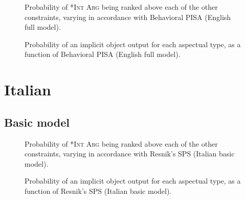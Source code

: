 \begin{figure}[H]
\caption{Probability of \textsc{*Int Arg} being ranked above each of the other constraints, varying in accordance with Behavioral PISA (English full model).}
    
\end{figure}

\begin{figure}[H]
\caption{Probability of an implicit object output for each aspectual type, as a function of Behavioral PISA (English full model).}
    
\end{figure}


\clearpage %

\section{Italian} 

\subsection{Basic model} 


\begin{figure}[H]
\caption{Probability of \textsc{*Int Arg} being ranked above each of the other constraints, varying in accordance with Resnik's SPS (Italian basic model).}
    
\end{figure}

\begin{figure}[H]
\caption{Probability of an implicit object output for each aspectual type, as a function of Resnik's SPS (Italian basic model).}
    
\end{figure}



